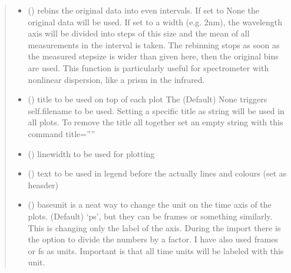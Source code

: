 \documentclass[letterpaper,10pt,english]{sphinxmanual}
\begin{document}
\begin{fulllineitems}
\begin{quote}
\begin{description}
\begin{itemize}
\item {} 
 (\sphinxstyleliteralemphasis{\sphinxupquote{, }}) \textendash{} rebins the original data into even intervals. If set to None the original data will be used.
If set to a width (e.g. 2nm), the wavelength axis will be divided into steps of this size
and the mean of all measurements in the interval is taken. The re\sphinxhyphen{}binning stops as soon as
the measured stepsize is wider than given here, then the original bins are used.
This function is particularly useful for spectrometer with non\sphinxhyphen{}linear dispersion,
like a prism in the infrared.

\item {} 
 (\sphinxstyleliteralemphasis{\sphinxupquote{, }}) \textendash{} title to be used on top of each plot
The (Default) None triggers  self.filename to be used. Setting a specific title as string will
be used in all plots. To remove the title all together set an empty string with this command title=””

\item {} 
 (\sphinxstyleliteralemphasis{\sphinxupquote{, }}) \textendash{} linewidth to be used for plotting

\item {} 
 (\sphinxstyleliteralemphasis{\sphinxupquote{, }}) \textendash{} text to be used in legend before the actually lines and colours (set as heasder)

\item {} 
 () \textendash{} baseunit is a neat way to change the unit on the time axis of the plots. (Default) ‘ps’, but they
can be frames or something similarly. This is changing only the label of the axis.
During the import there is the option to divide the numbers by a factor.
I have also used frames or fs as units. Important is that all time units will be labeled with
this unit.


\end{itemize}
\end{description}
\end{quote}
\end{fulllineitems}
\end{document}
